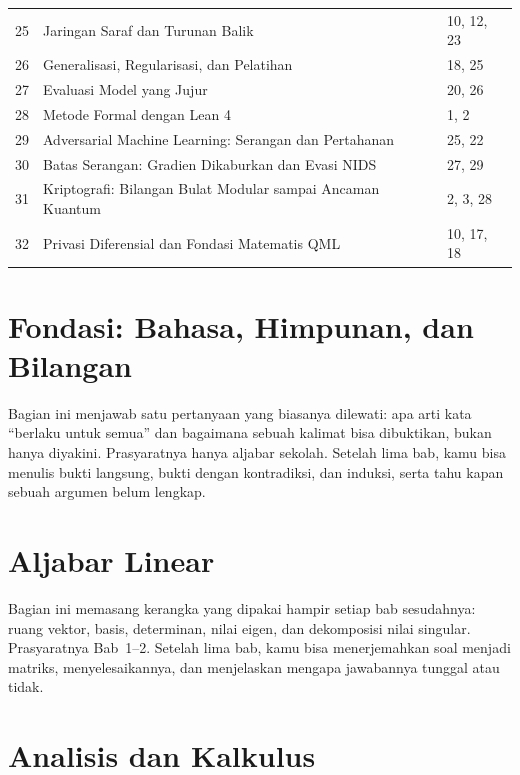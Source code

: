 \documentclass[11pt,a4paper,oneside]{book}
\theoremstyle{definition}
\theoremstyle{plain}
\theoremstyle{remark}
\begin{document}
\begin{center}
\begin{tabular}{@{}r p{9.0cm} p{2.8cm}@{}}
25 & Jaringan Saraf dan Turunan Balik & 10, 12, 23 \\
26 & Generalisasi, Regularisasi, dan Pelatihan & 18, 25 \\
27 & Evaluasi Model yang Jujur & 20, 26 \\
28 & Metode Formal dengan Lean 4 & 1, 2 \\
29 & Adversarial Machine Learning: Serangan dan Pertahanan & 25, 22 \\
30 & Batas Serangan: Gradien Dikaburkan dan Evasi NIDS & 27, 29 \\
31 & Kriptografi: Bilangan Bulat Modular sampai Ancaman Kuantum & 2, 3, 28 \\
32 & Privasi Diferensial dan Fondasi Matematis QML & 10, 17, 18 \\
\bottomrule
\end{tabular}
\end{center}

{}
\tableofcontents
\cleardoublepage
{}
{}
\listoffigures

\mainmatter

\part{Fondasi: Bahasa, Himpunan, dan Bilangan}

Bagian ini menjawab satu pertanyaan yang biasanya dilewati: apa arti kata
``berlaku untuk semua'' dan bagaimana sebuah kalimat bisa dibuktikan, bukan hanya
diyakini. Prasyaratnya hanya aljabar sekolah. Setelah lima bab, kamu bisa menulis
bukti langsung, bukti dengan kontradiksi, dan induksi, serta tahu kapan sebuah
argumen belum lengkap.






\part{Aljabar Linear}

Bagian ini memasang kerangka yang dipakai hampir setiap bab sesudahnya: ruang
vektor, basis, determinan, nilai eigen, dan dekomposisi nilai singular. Prasyaratnya
Bab~1--2. Setelah lima bab, kamu bisa menerjemahkan soal menjadi matriks,
menyelesaikannya, dan menjelaskan mengapa jawabannya tunggal atau tidak.






\part{Analisis dan Kalkulus}
\end{document}
